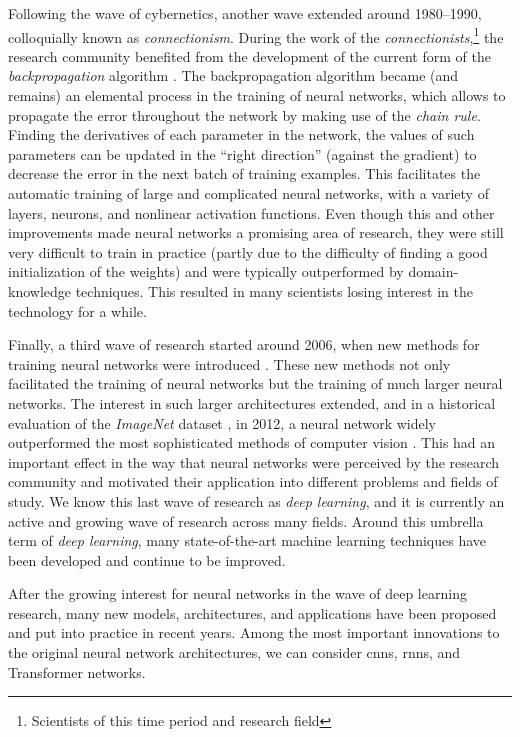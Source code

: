 Following the wave of cybernetics, another wave extended
around 1980--1990, colloquially known as
\emph{connectionism}. During the work of the
\emph{connectionists},\footnote{Scientists of this time
period and research field} the research community benefited
from the development of the current form of the
\emph{backpropagation} algorithm
\parencite{rumelhart1988learning}. The backpropagation
algorithm became (and remains) an elemental process in the
training of neural networks, which allows to propagate the
error throughout the network by making use of the
\emph{chain rule}. Finding the derivatives of each parameter
in the network, the values of such parameters can be updated
in the ``right direction'' (against the gradient) to
decrease the error in the next batch of training examples.
This facilitates the automatic training of large and
complicated neural networks, with a variety of layers,
neurons, and nonlinear activation functions. Even though
this and other improvements made neural networks a promising
area of research, they were still very difficult to train in
practice (partly due to the difficulty of finding a good
initialization of the weights) and were typically
outperformed by domain-knowledge techniques. This resulted
in many scientists losing interest in the technology for a
while.

Finally, a third wave of research started around 2006, when
new methods for training neural networks were introduced
\parencite{hinton2006fast}. These new methods not only
facilitated the training of neural networks but the training
of much larger neural networks. The interest in
such larger architectures extended, and in a historical
evaluation of the \emph{ImageNet} dataset
\parencite{deng2009imagenet}, in 2012, a neural network
widely outperformed the most sophisticated methods of
computer vision \parencite{krizhevsky2012imagenet}. This had
an important effect in the way that neural networks were
perceived by the research community and motivated their
application into different problems and fields of study. We
know this last wave of research as \emph{deep learning}, and
it is currently an active and growing wave of research
across many fields. Around this umbrella term of \emph{deep
learning}, many state-of-the-art machine learning techniques
have been developed and continue to be improved.

 After the growing
interest for neural networks in the wave of deep learning
research, many new models, architectures, and applications
have been proposed and put into practice in recent years.
Among the most important innovations to the original neural
network architectures, we can consider \glspl{cnn},
\glspl{rnn}, and Transformer networks.

